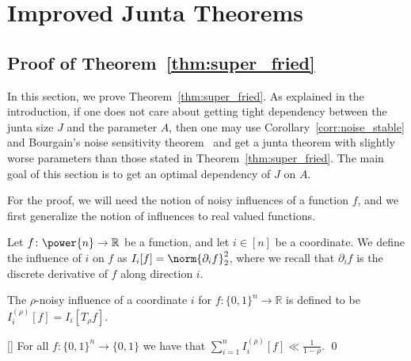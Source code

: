 \section{Improved Junta Theorems}\label{sec:super_fried}
\subsection{Proof of Theorem~\ref{thm:super_fried}}
In this section, we prove Theorem~\ref{thm:super_fried}. As explained in the introduction, if one does not care about getting tight dependency
between the junta size $J$ and the parameter $A$, then one may use Corollary~\ref{corr:noise_stable} and Bourgain's noise sensitivity theorem~\cite{Bourgain,kindler2018gaussian}
and get a junta theorem with slightly worse parameters than those stated in Theorem~\ref{thm:super_fried}. The main goal of this section
is to get an optimal dependency of $J$ on $A$.

For the proof, we will need the notion of noisy influences of a function $f$, and we first generalize the notion of influences to real valued functions.
\begin{definition}
  Let $f\colon\power{n}\to\mathbb{R}$ be a function, and let $i\in [n]$ be a coordinate.
  We define the influence of $i$ on $f$ as $I_i[f] = \norm{\partial_i f}_2^2$, where
  we recall that $\partial_i f$ is the discrete derivative of $f$ along direction $i$.
\end{definition}
\begin{definition}
  The $\rho$-noisy influence of a coordinate $i$ for $f\colon\{0,1\}^n\to\mathbb{R}$ is defined to be
  $I_i^{(\rho)}[f] = I_i[T_{\rho} f]$.
\end{definition}

\begin{fact}\label{fact:sum_of_noisy}[\cite{ODonnell}]
  For all $f\colon\{0,1\}^n\to\{0,1\}$ we have that $\sum\limits_{i=1}^{n} I_i^{(\rho)}[f] \ll \frac{1}{1-\rho}$.
  \qed
\end{fact}


